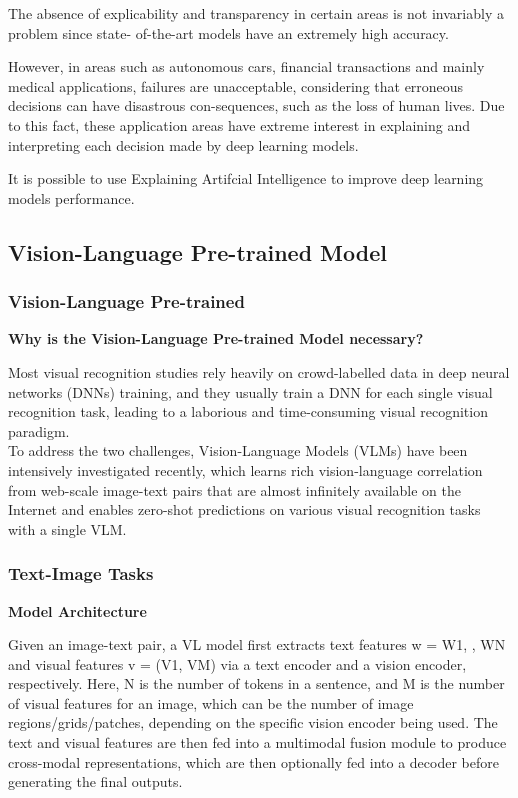 The absence of explicability and transparency in certain areas is not invariably a problem since state- of-the-art models have an extremely high accuracy.

However, in areas such as autonomous cars, financial transactions and mainly medical applications, failures are unacceptable, considering that erroneous decisions can have disastrous con-sequences, such as the loss of human lives. Due to this fact, these application areas have extreme interest in explaining and interpreting each decision made by deep learning models.

It is possible to use Explaining Artifcial Intelligence to improve deep learning models performance.







\subsection{Vision-Language Pre-trained Model}
\subsubsection{Vision-Language Pre-trained}
\textbf{Why is the Vision-Language Pre-trained Model necessary?}

Most visual recognition studies rely heavily on crowd-labelled data in deep neural networks (DNNs) training, and they usually train a DNN for each single visual recognition task, leading to a laborious and time-consuming visual recognition paradigm.\\

To address the two challenges, Vision-Language Models (VLMs) have been intensively investigated recently, which learns rich vision-language correlation from web-scale image-text pairs that are almost infinitely available on the Internet and enables zero-shot predictions on various visual recognition tasks with a single VLM.

\subsubsection{Text-Image Tasks}
\textbf{Model Architecture}

Given an image-text pair, a VL model first extracts text features w = {W1, , WN} and visual features v = (V1, VM) via a text encoder and a vision encoder, respectively. Here, N is the number of tokens in a sentence, and M is the number of visual features for an image, which can be the number of image regions/grids/patches, depending on the specific vision encoder being used. The text and visual features are then fed into a multimodal fusion module to produce cross-modal representations, which are then optionally fed into a decoder before generating the final outputs.





